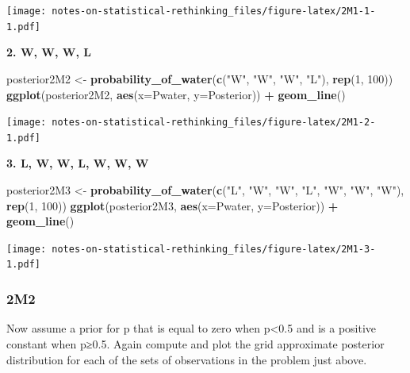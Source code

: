 \documentclass[
]{book}
\newenvironment{Shaded}{\begin{snugshade}}{\end{snugshade}}
\newcommand{\DataTypeTok}[1]{\textcolor[rgb]{0.13,0.29,0.53}{#1}}
\newcommand{\DecValTok}[1]{\textcolor[rgb]{0.00,0.00,0.81}{#1}}
\newcommand{\KeywordTok}[1]{\textcolor[rgb]{0.13,0.29,0.53}{\textbf{#1}}}
\newcommand{\NormalTok}[1]{#1}
\newcommand{\OperatorTok}[1]{\textcolor[rgb]{0.81,0.36,0.00}{\textbf{#1}}}
\newcommand{\StringTok}[1]{\textcolor[rgb]{0.31,0.60,0.02}{#1}}
\begin{document}
\texttt{[image: notes-on-statistical-rethinking\_files/figure-latex/2M1-1-1.pdf]}

\textbf{2. W, W, W, L}

\begin{Shaded}
\begin{Highlighting}[]
\NormalTok{posterior2M2 \textless{}{-}}\StringTok{ }\KeywordTok{probability\_of\_water}\NormalTok{(}\KeywordTok{c}\NormalTok{(}\StringTok{"W"}\NormalTok{, }\StringTok{"W"}\NormalTok{, }\StringTok{"W"}\NormalTok{, }\StringTok{"L"}\NormalTok{), }\KeywordTok{rep}\NormalTok{(}\DecValTok{1}\NormalTok{, }\DecValTok{100}\NormalTok{))}
\KeywordTok{ggplot}\NormalTok{(posterior2M2, }\KeywordTok{aes}\NormalTok{(}\DataTypeTok{x=}\NormalTok{Pwater, }\DataTypeTok{y=}\NormalTok{Posterior)) }\OperatorTok{+}\StringTok{ }
\StringTok{  }\KeywordTok{geom\_line}\NormalTok{()}
\end{Highlighting}
\end{Shaded}

\texttt{[image: notes-on-statistical-rethinking\_files/figure-latex/2M1-2-1.pdf]}

\textbf{3. L, W, W, L, W, W, W}

\begin{Shaded}
\begin{Highlighting}[]
\NormalTok{posterior2M3 \textless{}{-}}\StringTok{ }\KeywordTok{probability\_of\_water}\NormalTok{(}\KeywordTok{c}\NormalTok{(}\StringTok{"L"}\NormalTok{, }\StringTok{"W"}\NormalTok{, }\StringTok{"W"}\NormalTok{, }\StringTok{"L"}\NormalTok{, }\StringTok{"W"}\NormalTok{, }\StringTok{"W"}\NormalTok{, }\StringTok{"W"}\NormalTok{), }\KeywordTok{rep}\NormalTok{(}\DecValTok{1}\NormalTok{, }\DecValTok{100}\NormalTok{))}
\KeywordTok{ggplot}\NormalTok{(posterior2M3, }\KeywordTok{aes}\NormalTok{(}\DataTypeTok{x=}\NormalTok{Pwater, }\DataTypeTok{y=}\NormalTok{Posterior)) }\OperatorTok{+}\StringTok{ }
\StringTok{  }\KeywordTok{geom\_line}\NormalTok{()}
\end{Highlighting}
\end{Shaded}

\texttt{[image: notes-on-statistical-rethinking\_files/figure-latex/2M1-3-1.pdf]}

\hypertarget{m2}{%
\subsubsection*{2M2}\label{m2}}

Now assume a prior for p that is equal to zero when p\textless0.5 and is a positive constant when p≥0.5. Again compute and plot the grid approximate posterior distribution for each of the sets of observations in the problem just above.
\end{document}
